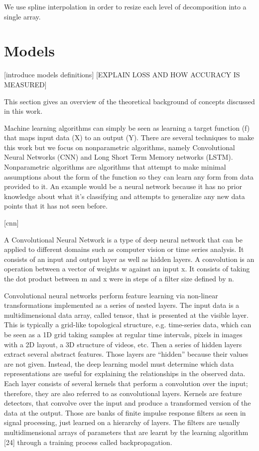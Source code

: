 \documentclass{turabian-thesis}
\begin{document}
We use spline interpolation in order to resize each level of decomposition into a single array.






\section{Models}
[introduce models definitions]
[EXPLAIN LOSS AND HOW ACCURACY IS MEASURED]

This section gives an overview of the theoretical background of concepts discussed in this work. 

Machine learning algorithms can simply be seen as learning a target function (f) that maps input data (X) to an output (Y). There are several techniques to make this work but we focus on nonparametric algorithms, namely Convolutional Neural Networks (CNN) and Long Short Term Memory networks (LSTM). Nonparametric algorithms are algorithms that attempt to make minimal assumptions about the form of the function so they can learn any form from data provided to it. An example would be a neural network because it has no prior knowledge about what it’s classifying and attempts to generalize any new data points that it has not seen before.


[cnn]

A Convolutional Neural Network is a type of deep neural network that can be applied to different domains such as computer vision or time series analysis. It consists of an input and output layer as well as hidden layers. A convolution is an operation between a vector of weights w against an input x. It consists of taking the dot product between m and x were in steps of a filter size defined by n.

Convolutional neural networks perform feature learning via non-linear transformations implemented as a series of nested layers. The input data is a multidimensional data array, called tensor, that is presented at the visible layer. This is typically a grid-like topological structure, e.g. time-series data, which can be seen as a 1D grid taking samples at regular time intervals, pixels in images with a 2D layout, a 3D structure of videos, etc. Then a series of hidden layers extract several abstract features. Those layers are “hidden” because their values are not given. Instead, the deep learning model must determine which data representations are useful for explaining the relationships in the observed data. Each layer consists of several kernels that perform a convolution over the input; therefore, they are also referred to as convolutional layers. Kernels are feature detectors, that convolve over the input and produce a transformed version of the data at the output. Those are banks of finite impulse response filters as seen in signal processing, just learned on a hierarchy of layers. The filters are usually multidimensional arrays of parameters that are learnt by the learning algorithm [24] through a training process called backpropagation.
\end{document}
